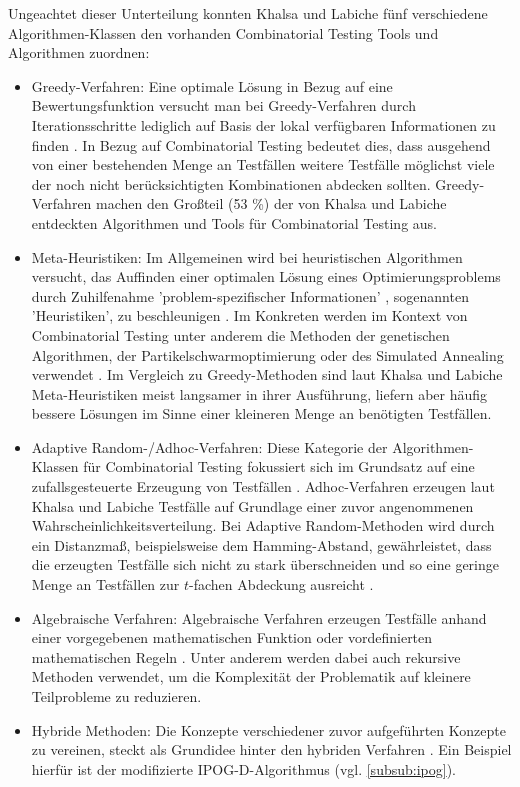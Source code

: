 Ungeachtet dieser Unterteilung konnten Khalsa und Labiche \cite{khalsa2014orchestrated} fünf verschiedene Algorithmen-Klassen den vorhanden Combinatorial Testing Tools und Algorithmen zuordnen:
\begin{itemize}
\item Greedy-Verfahren: Eine optimale Lösung in Bezug auf eine Bewertungsfunktion versucht man bei Greedy-Verfahren durch Iterationsschritte lediglich auf Basis der lokal verfügbaren Informationen zu finden \cite[S. 185]{schoening2001algorithmik}. In Bezug auf Combinatorial Testing bedeutet dies, dass ausgehend von einer bestehenden Menge an Testfällen weitere Testfälle möglichst viele der noch nicht berücksichtigten Kombinationen abdecken \cite{khalsa2014orchestrated} sollten. Greedy-Verfahren machen den Großteil (53 \%) der von Khalsa und Labiche \cite{khalsa2014orchestrated} entdeckten Algorithmen und Tools für Combinatorial Testing aus.
\item Meta-Heuristiken: Im Allgemeinen wird bei heuristischen Algorithmen versucht, das Auffinden einer optimalen Lösung eines Optimierungsproblems durch Zuhilfenahme 'problem-spezifischer Informationen' \cite[S. 319]{schoening2001algorithmik}, sogenannten 'Heuristiken', zu beschleunigen \cite[S. 319]{schoening2001algorithmik}. Im Konkreten werden im Kontext von Combinatorial Testing unter anderem die Methoden der genetischen Algorithmen, der Partikelschwarmoptimierung oder des Simulated Annealing verwendet \cite{khalsa2014orchestrated}. Im Vergleich zu Greedy-Methoden sind laut Khalsa und Labiche \cite{khalsa2014orchestrated} Meta-Heuristiken meist langsamer in ihrer Ausführung, liefern aber häufig bessere Lösungen im Sinne einer kleineren Menge an benötigten Testfällen.
\item Adaptive Random-/Adhoc-Verfahren: Diese Kategorie der Algorithmen-Klassen für Combinatorial Testing fokussiert sich im Grundsatz auf eine zufallsgesteuerte Erzeugung von Testfällen \cite{khalsa2014orchestrated}. Adhoc-Verfahren erzeugen laut Khalsa und Labiche \cite{khalsa2014orchestrated} Testfälle auf Grundlage einer zuvor angenommenen Wahrscheinlichkeitsverteilung. Bei Adaptive Random-Methoden wird durch ein Distanzmaß, beispielsweise dem Hamming-Abstand, gewährleistet, dass die erzeugten Testfälle sich nicht zu stark überschneiden und so eine geringe Menge an Testfällen zur $t$-fachen Abdeckung ausreicht \cite{khalsa2014orchestrated}. 
\item Algebraische Verfahren: Algebraische Verfahren erzeugen Testfälle anhand einer vorgegebenen mathematischen Funktion oder vordefinierten mathematischen Regeln \cite{khalsa2014orchestrated}. Unter anderem werden dabei auch rekursive Methoden verwendet, um die Komplexität der Problematik auf kleinere Teilprobleme zu reduzieren.
\item Hybride Methoden: Die Konzepte verschiedener zuvor aufgeführten Konzepte zu vereinen, steckt als Grundidee hinter den hybriden Verfahren \cite{khalsa2014orchestrated}. Ein Beispiel hierfür ist der modifizierte IPOG-D-Algorithmus (vgl. \autoref{subsub:ipog}).
\end{itemize}

